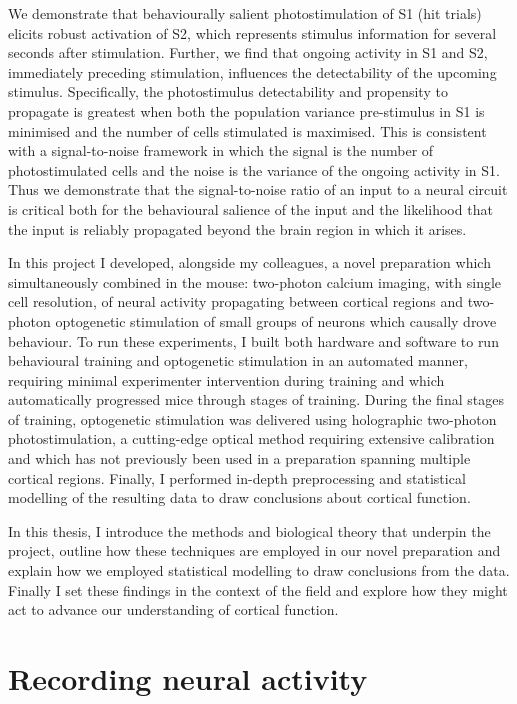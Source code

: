 We demonstrate that behaviourally salient photostimulation of S1 (hit trials) elicits robust activation of S2, which represents stimulus information for several seconds after stimulation. Further, we find that ongoing activity in S1 and S2, immediately preceding stimulation, influences the detectability of the upcoming stimulus. Specifically, the photostimulus detectability and propensity to propagate is greatest when both the population variance pre-stimulus in S1 is minimised and the number of cells stimulated is maximised. This is consistent with a signal-to-noise framework in which the signal is the number of photostimulated cells and the noise is the variance of the ongoing activity in S1. Thus we demonstrate that the signal-to-noise ratio of an input to a neural circuit is critical both for the behavioural salience of the input and the likelihood that the input is reliably propagated beyond the brain region in which it arises.

In this project I developed, alongside my colleagues, a novel preparation which simultaneously combined in the mouse: two-photon calcium imaging, with single cell resolution, of neural activity propagating between cortical regions and two-photon optogenetic stimulation of small groups of neurons which causally drove behaviour. To run these experiments, I built both hardware and software to run behavioural training and optogenetic stimulation in an automated manner, requiring minimal experimenter intervention during training and which automatically progressed mice through stages of training. During the final stages of training, optogenetic stimulation was delivered using holographic two-photon photostimulation, a cutting-edge optical method requiring extensive calibration and which has not previously been used in a preparation spanning multiple cortical regions. Finally, I performed in-depth preprocessing and statistical modelling of the resulting data to draw conclusions about cortical function.

In this thesis, I introduce the methods and biological theory that underpin the project, outline how these techniques are employed in our novel preparation and explain how we employed statistical modelling to draw conclusions from the data. Finally I set these findings in the context of the field and explore how they might act to advance our understanding of cortical function.

\section{Recording neural activity}


